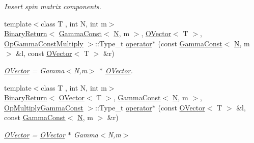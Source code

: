 \begin{DoxyCompactItemize}
\begin{DoxyCompactList}\small\item\em Insert spin matrix components. \end{DoxyCompactList}\item 
{\footnotesize template$<$class T , int N, int m$>$ }\\\mbox{\hyperlink{structENSEM_1_1BinaryReturn}{Binary\+Return}}$<$ \mbox{\hyperlink{classENSEM_1_1GammaConst}{Gamma\+Const}}$<$ \mbox{\hyperlink{operator__name__util_8cc_a7722c8ecbb62d99aee7ce68b1752f337}{N}}, m $>$, \mbox{\hyperlink{classENSEM_1_1OVector}{O\+Vector}}$<$ T $>$, \mbox{\hyperlink{structENSEM_1_1OpGammaConstMultiply}{Op\+Gamma\+Const\+Multiply}} $>$\+::Type\+\_\+t \mbox{\hyperlink{group__obsvector_gaae51a4414b6efe2f47cc4c62841aabf9}{operator$\ast$}} (const \mbox{\hyperlink{classENSEM_1_1GammaConst}{Gamma\+Const}}$<$ \mbox{\hyperlink{operator__name__util_8cc_a7722c8ecbb62d99aee7ce68b1752f337}{N}}, m $>$ \&l, const \mbox{\hyperlink{classENSEM_1_1OVector}{O\+Vector}}$<$ T $>$ \&r)
\begin{DoxyCompactList}\small\item\em \mbox{\hyperlink{classENSEM_1_1OVector}{O\+Vector}} = Gamma$<$\+N,m$>$ $\ast$ \mbox{\hyperlink{classENSEM_1_1OVector}{O\+Vector}}. \end{DoxyCompactList}\item 
{\footnotesize template$<$class T , int N, int m$>$ }\\\mbox{\hyperlink{structENSEM_1_1BinaryReturn}{Binary\+Return}}$<$ \mbox{\hyperlink{classENSEM_1_1OVector}{O\+Vector}}$<$ T $>$, \mbox{\hyperlink{classENSEM_1_1GammaConst}{Gamma\+Const}}$<$ \mbox{\hyperlink{operator__name__util_8cc_a7722c8ecbb62d99aee7ce68b1752f337}{N}}, m $>$, \mbox{\hyperlink{structENSEM_1_1OpMultiplyGammaConst}{Op\+Multiply\+Gamma\+Const}} $>$\+::Type\+\_\+t \mbox{\hyperlink{group__obsvector_ga4cead70d208b90a7a2b58aa6251d78b0}{operator$\ast$}} (const \mbox{\hyperlink{classENSEM_1_1OVector}{O\+Vector}}$<$ T $>$ \&l, const \mbox{\hyperlink{classENSEM_1_1GammaConst}{Gamma\+Const}}$<$ \mbox{\hyperlink{operator__name__util_8cc_a7722c8ecbb62d99aee7ce68b1752f337}{N}}, m $>$ \&r)
\begin{DoxyCompactList}\small\item\em \mbox{\hyperlink{classENSEM_1_1OVector}{O\+Vector}} = \mbox{\hyperlink{classENSEM_1_1OVector}{O\+Vector}} $\ast$ Gamma$<$\+N,m$>$ \end{DoxyCompactList}\item 

\end{DoxyCompactItemize}
